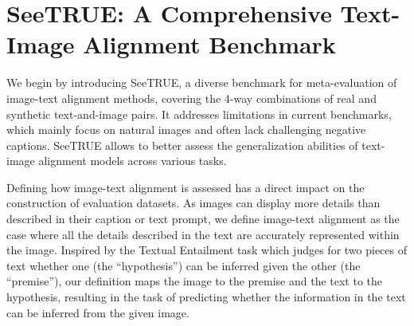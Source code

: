 \documentclass{article}
\newcommand{\datasetname}[0]{SeeTRUE\xspace}
\begin{document}
\section{SeeTRUE: A Comprehensive Text-Image Alignment Benchmark}
\label{sec:datasets}

We begin by introducing \datasetname, a diverse benchmark for meta-evaluation of image-text alignment methods, covering the 4-way combinations of real and synthetic text-and-image pairs. It addresses limitations in current benchmarks, which mainly focus on natural images and often lack challenging negative captions. SeeTRUE allows to better assess the generalization abilities of text-image alignment models across various tasks.  

Defining how image-text alignment is assessed has a direct impact on the construction of evaluation datasets. As images can display more details than described in their caption or text prompt, we define image-text alignment as the case where all the details described in the text are accurately represented within the image. Inspired by the Textual Entailment task \citep{dagan2010recognizing} which judges for two pieces of text whether one (the ``hypothesis'') can be inferred given the other (the ``premise''), our definition maps the image to the premise and the text to the hypothesis, resulting in the task of predicting whether the information in the text can be inferred from the given image. 
\end{document}
